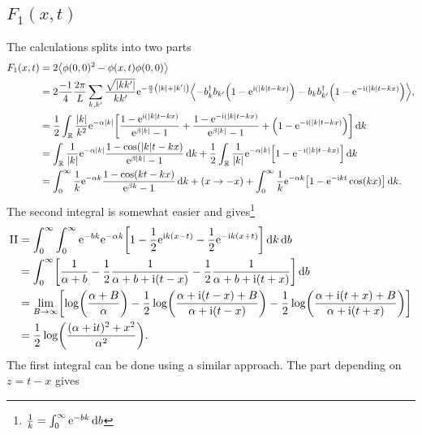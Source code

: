 \documentclass[english, parskip=full]{scrartcl}
\begin{document}
\subsection{$F_1(x,t)$}
The calculations splits into two parts
\begin{align}
F_1(x,t) &= 2\bra*{\phi(0,0)^2 - \phi(x,t)\phi(0,0)} \\
&= 2 \frac{-1}{4} \frac{2\pi}{L} \sum_{k,k'} \frac{\sqrt{|kk'|}}{kk'} \powe{-\frac{\alpha}{2} \kla*{|k| + |k'|}} \bra*{-b_k^\dagger b_{k'} \kla*{1 - \powe{\i (|k|t-kx)}} - b_k b_{k'}^\dagger \kla*{1 - \powe{-\i (|k|t-kx)}}},\\
&= \frac{1}{2} \intr{ \frac{|k|}{k^2} \powe{-\alpha |k|} \klb*{\frac{1 - \powe{\i (|k|t-kx)}}{\powe{\beta |k|} - 1} + \frac{1 - \powe{-\i (|k|t-kx)}}{\powe{\beta |k|} - 1} + \kla*{1 - \powe{-\i (|k|t-kx)}}} }{k}\\
&= \intr{\frac{1}{|k|}\powe{-\alpha |k|} \frac{1 - \cos\kla*{|k|t - kx}}{\powe{\beta |k|} - 1}}{k} + \frac{1}{2} \intr{\frac{1}{|k|} \powe{-\alpha |k|} \klb*{1 - \powe{-\i (|k|t-kx)}}}{k}\\
&= \intx{0}{\infty}{\frac{1}{k} \powe{-\alpha k} \frac{1 - \cos\kla*{kt-kx}}{\powe{\beta k} - 1}}{k} + (x\rightarrow -x) + \intx{0}{\infty}{\frac{1}{k} \powe{-\alpha k} \klb*{1 - \powe{-\i kt} \cos(kx)}}{k}.
\end{align}
The second integral is somewhat easier and gives\footnote{$\frac{1}{k} = \int_{0}^{\infty} \text{e}^{-bk} \,\mathrm{d}b$}
\begin{align}
\text{II} &= \intx{0}{\infty}{\intx{0}{\infty}{\powe{-bk} \powe{-\alpha k} \klb*{1 - \frac{1}{2} \powe{\i k(x-t)} - \frac{1}{2} \powe{-\i k(x+t)}}}{k}}{b}\\
&= \intx{0}{\infty}{\klb*{\frac{1}{\alpha + b} - \frac{1}{2} \frac{1}{\alpha + b + \i (t-x)} - \frac{1}{2} \frac{1}{\alpha + b + \i (t+x)}}}{b}\\
&= \lim_{B\rightarrow \infty} \klb*{\log \kla*{\frac{\alpha + B}{\alpha}} - \frac{1}{2} \log\kla*{\frac{\alpha + \i (t-x) + B}{\alpha + \i(t-x)}} - \frac{1}{2} \log\kla*{\frac{\alpha + \i(t+x) + B}{\alpha + \i (t+x)}}}\\
&= \frac{1}{2} \log\kla*{\frac{(\alpha + \i t)^2 + x^2}{\alpha^2}}.
\end{align}
The first integral can be done using a similar approach.
The part depending on $z=t-x$ gives
\end{document}
